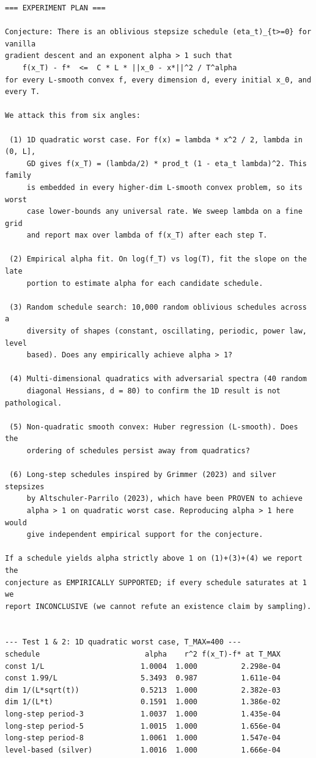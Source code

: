 \documentclass[11pt]{article}
\begin{document}
\begin{lstlisting}
=== EXPERIMENT PLAN ===

Conjecture: There is an oblivious stepsize schedule (eta_t)_{t>=0} for vanilla
gradient descent and an exponent alpha > 1 such that
    f(x_T) - f*  <=  C * L * ||x_0 - x*||^2 / T^alpha
for every L-smooth convex f, every dimension d, every initial x_0, and every T.

We attack this from six angles:

 (1) 1D quadratic worst case. For f(x) = lambda * x^2 / 2, lambda in (0, L],
     GD gives f(x_T) = (lambda/2) * prod_t (1 - eta_t lambda)^2. This family
     is embedded in every higher-dim L-smooth convex problem, so its worst
     case lower-bounds any universal rate. We sweep lambda on a fine grid
     and report max over lambda of f(x_T) after each step T.

 (2) Empirical alpha fit. On log(f_T) vs log(T), fit the slope on the late
     portion to estimate alpha for each candidate schedule.

 (3) Random schedule search: 10,000 random oblivious schedules across a
     diversity of shapes (constant, oscillating, periodic, power law, level
     based). Does any empirically achieve alpha > 1?

 (4) Multi-dimensional quadratics with adversarial spectra (40 random
     diagonal Hessians, d = 80) to confirm the 1D result is not pathological.

 (5) Non-quadratic smooth convex: Huber regression (L-smooth). Does the
     ordering of schedules persist away from quadratics?

 (6) Long-step schedules inspired by Grimmer (2023) and silver stepsizes
     by Altschuler-Parrilo (2023), which have been PROVEN to achieve
     alpha > 1 on quadratic worst case. Reproducing alpha > 1 here would
     give independent empirical support for the conjecture.

If a schedule yields alpha strictly above 1 on (1)+(3)+(4) we report the
conjecture as EMPIRICALLY SUPPORTED; if every schedule saturates at 1 we
report INCONCLUSIVE (we cannot refute an existence claim by sampling).


--- Test 1 & 2: 1D quadratic worst case, T_MAX=400 ---
schedule                        alpha    r^2 f(x_T)-f* at T_MAX
const 1/L                      1.0004  1.000          2.298e-04
const 1.99/L                   5.3493  0.987          1.611e-04
dim 1/(L*sqrt(t))              0.5213  1.000          2.382e-03
dim 1/(L*t)                    0.1591  1.000          1.386e-02
long-step period-3             1.0037  1.000          1.435e-04
long-step period-5             1.0015  1.000          1.656e-04
long-step period-8             1.0061  1.000          1.547e-04
level-based (silver)           1.0016  1.000          1.666e-04


\end{lstlisting}
\end{document}
